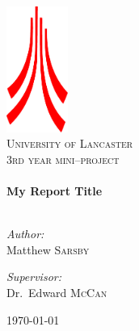 
\begin{titlepage}

\begin{center}
\hspace{1cm} %
\vspace{4cm}

\includegraphics[width=0.15\textwidth]{./pics/logo}\\[1cm]    

\textsc{\LARGE University of Lancaster}\\[1.5cm]

\textsc{\Large 3rd year mini--project}\\[0.5cm]


\HRule \\[0.4cm]
{ \huge \bfseries My Report Title}\\[0.1cm]

\HRule \\[1.5cm]

\begin{minipage}{0.4\textwidth}
\begin{flushleft} \large
\emph{Author:}\\
Matthew \textsc{Sarsby}
\end{flushleft}
\end{minipage}
\begin{minipage}{0.4\textwidth}
\begin{flushright} \large
\emph{Supervisor:} \\
Dr.~Edward \textsc{McCan}
\end{flushright}
\end{minipage}

\vfill

{\large \today}

\end{center}

\end{titlepage}

